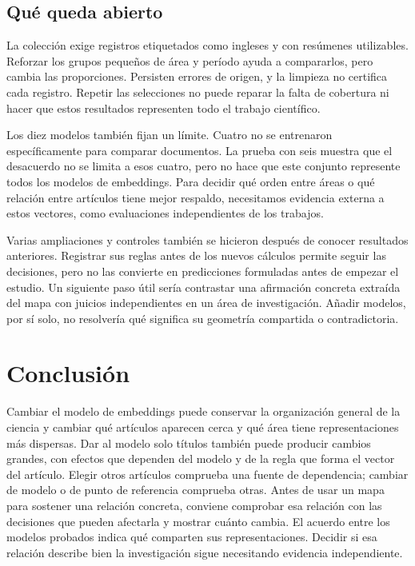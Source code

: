 \documentclass[12pt]{article}
\begin{document}
\subsection{Qué queda abierto}
La colección exige registros etiquetados como ingleses y con resúmenes utilizables. Reforzar los grupos pequeños de área y período ayuda a compararlos, pero cambia las proporciones. Persisten errores de origen, y la limpieza no certifica cada registro. Repetir las selecciones no puede reparar la falta de cobertura ni hacer que estos resultados representen todo el trabajo científico.

Los diez modelos también fijan un límite. Cuatro no se entrenaron específicamente para comparar documentos. La prueba con seis muestra que el desacuerdo no se limita a esos cuatro, pero no hace que este conjunto represente todos los modelos de embeddings. Para decidir qué orden entre áreas o qué relación entre artículos tiene mejor respaldo, necesitamos evidencia externa a estos vectores, como evaluaciones independientes de los trabajos.

Varias ampliaciones y controles también se hicieron después de conocer resultados anteriores. Registrar sus reglas antes de los nuevos cálculos permite seguir las decisiones, pero no las convierte en predicciones formuladas antes de empezar el estudio. Un siguiente paso útil sería contrastar una afirmación concreta extraída del mapa con juicios independientes en un área de investigación. Añadir modelos, por sí solo, no resolvería qué significa su geometría compartida o contradictoria.

\section{Conclusión}
Cambiar el modelo de embeddings puede conservar la organización general de la ciencia y cambiar qué artículos aparecen cerca y qué área tiene representaciones más dispersas. Dar al modelo solo títulos también puede producir cambios grandes, con efectos que dependen del modelo y de la regla que forma el vector del artículo. Elegir otros artículos comprueba una fuente de dependencia; cambiar de modelo o de punto de referencia comprueba otras. Antes de usar un mapa para sostener una relación concreta, conviene comprobar esa relación con las decisiones que pueden afectarla y mostrar cuánto cambia. El acuerdo entre los modelos probados indica qué comparten sus representaciones. Decidir si esa relación describe bien la investigación sigue necesitando evidencia independiente.
\end{document}

